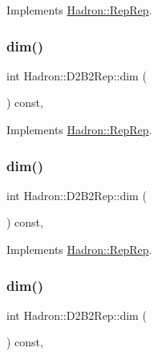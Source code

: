 Implements \mbox{\hyperlink{structHadron_1_1RepRep_a92c8802e5ed7afd7da43ccfd5b7cd92b}{Hadron\+::\+Rep\+Rep}}.

\mbox{\label{structHadron_1_1D2B2Rep_a3b51f6989d504745873697ad4dfde43b}} 
\subsubsection{\texorpdfstring{dim()}{dim()}\hspace{0.1cm}{\footnotesize\ttfamily [3/5]}}
{\footnotesize\ttfamily int Hadron\+::\+D2\+B2\+Rep\+::dim (\begin{DoxyParamCaption}{ }\end{DoxyParamCaption}) const\hspace{0.3cm}{\ttfamily [inline]}, {\ttfamily [virtual]}}



Implements \mbox{\hyperlink{structHadron_1_1RepRep_a92c8802e5ed7afd7da43ccfd5b7cd92b}{Hadron\+::\+Rep\+Rep}}.

\mbox{\label{structHadron_1_1D2B2Rep_a3b51f6989d504745873697ad4dfde43b}} 
\subsubsection{\texorpdfstring{dim()}{dim()}\hspace{0.1cm}{\footnotesize\ttfamily [4/5]}}
{\footnotesize\ttfamily int Hadron\+::\+D2\+B2\+Rep\+::dim (\begin{DoxyParamCaption}{ }\end{DoxyParamCaption}) const\hspace{0.3cm}{\ttfamily [inline]}, {\ttfamily [virtual]}}



Implements \mbox{\hyperlink{structHadron_1_1RepRep_a92c8802e5ed7afd7da43ccfd5b7cd92b}{Hadron\+::\+Rep\+Rep}}.

\mbox{\label{structHadron_1_1D2B2Rep_a3b51f6989d504745873697ad4dfde43b}} 
\subsubsection{\texorpdfstring{dim()}{dim()}\hspace{0.1cm}{\footnotesize\ttfamily [5/5]}}
{\footnotesize\ttfamily int Hadron\+::\+D2\+B2\+Rep\+::dim (\begin{DoxyParamCaption}{ }\end{DoxyParamCaption}) const\hspace{0.3cm}{\ttfamily [inline]}, {\ttfamily [virtual]}}



